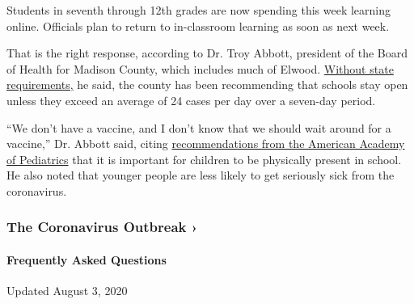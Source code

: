 Students in seventh through 12th grades are now spending this week
learning online. Officials plan to return to in-classroom learning as
soon as next week.

That is the right response, according to Dr. Troy Abbott, president of
the Board of Health for Madison County, which includes much of Elwood.
\href{https://www.indystar.com/story/news/education/2020/08/02/indiana-schools-reopening-how-we-know-districts-safe/5558849002/}{Without
state requirements,} he said, the county has been recommending that
schools stay open unless they exceed an average of 24 cases per day over
a seven-day period.

``We don't have a vaccine, and I don't know that we should wait around
for a vaccine,'' Dr. Abbott said, citing
\href{https://www.nytimes.com/2020/06/30/us/coronavirus-schools-reopening-guidelines-aap.html}{recommendations
from the American Academy of Pediatrics} that it is important for
children to be physically present in school. He also noted that younger
people are less likely to get seriously sick from the coronavirus.

\href{https://www.nytimes.com/news-event/coronavirus?action=click\&pgtype=Article\&state=default\&region=MAIN_CONTENT_3\&context=storylines_faq}{}

\hypertarget{the-coronavirus-outbreak-}{%
\subsubsection{The Coronavirus Outbreak
›}\label{the-coronavirus-outbreak-}}

\hypertarget{frequently-asked-questions}{%
\paragraph{Frequently Asked
Questions}\label{frequently-asked-questions}}

Updated August 3, 2020

